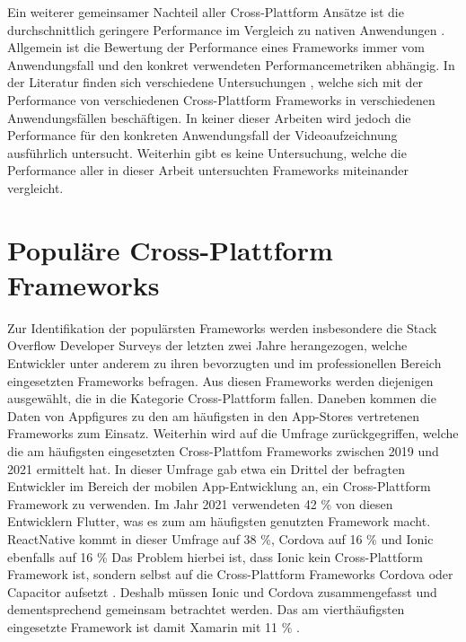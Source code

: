 Ein weiterer gemeinsamer Nachteil aller Cross-Plattform Ansätze ist die durchschnittlich geringere Performance im Vergleich zu nativen Anwendungen \cite{Que_Comparison_Hybrid_Native, Pinto_Native_to_Cross_Platform}.
Allgemein ist die Bewertung der Performance eines Frameworks immer vom Anwendungsfall und den konkret verwendeten Performancemetriken abhängig.
In der Literatur finden sich verschiedene Untersuchungen \cite{Nawrocki_Comparison_Hybrid_Native_Frameworks,Biorn-Hansen_PerformanceOverhead_CrossPlatform}, welche sich mit der Performance von verschiedenen Cross-Plattform Frameworks in verschiedenen Anwendungsfällen beschäftigen.
In keiner dieser Arbeiten wird jedoch die Performance für den konkreten Anwendungsfall der Videoaufzeichnung ausführlich untersucht.
Weiterhin gibt es keine Untersuchung, welche die Performance aller in dieser Arbeit untersuchten Frameworks miteinander vergleicht.



\section{Populäre Cross-Plattform Frameworks}
\label{sec:frameworks_auswahl}
Zur Identifikation der populärsten Frameworks werden insbesondere die Stack Overflow Developer Surveys der letzten zwei Jahre \cite{Stackoverflow_2021} \cite{Stackoverflow_2022} herangezogen, welche Entwickler unter anderem zu ihren bevorzugten und im professionellen Bereich eingesetzten Frameworks befragen.
Aus diesen Frameworks werden diejenigen ausgewählt, die in die Kategorie Cross-Plattform fallen.
Daneben kommen die Daten von Appfigures zu den am häufigsten in den App-Stores vertretenen Frameworks \cite{Appfigures_TopSDKs} zum Einsatz.
Weiterhin wird auf die Umfrage \cite{Statista_UsedCrossPlatformFrameworks} zurückgegriffen, welche die am häufigsten eingesetzten Cross-Plattfom Frameworks zwischen 2019 und 2021 ermittelt hat.
In dieser Umfrage gab etwa ein Drittel der befragten Entwickler im Bereich der mobilen App-Entwicklung an, ein Cross-Plattform Framework zu verwenden.
Im Jahr 2021 verwendeten 42 \% von diesen Entwicklern Flutter, was es zum am häufigsten genutzten Framework macht.
ReactNative kommt in dieser Umfrage auf 38 \%, Cordova auf 16 \% und Ionic ebenfalls auf 16 \%
Das Problem hierbei ist, dass Ionic kein Cross-Plattform Framework ist, sondern selbst auf die Cross-Plattform Frameworks Cordova oder Capacitor aufsetzt \cite{Ionic_Docs}.
Deshalb müssen Ionic und Cordova zusammengefasst und dementsprechend gemeinsam betrachtet werden.
Das am vierthäufigsten eingesetzte Framework ist damit Xamarin mit 11 \% \cite{Statista_UsedCrossPlatformFrameworks}.

